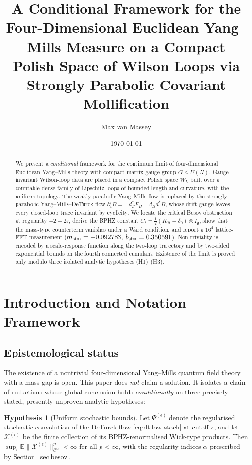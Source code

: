\documentclass[11pt,a4paper]{article}
\title{A Conditional Framework for the Four-Dimensional Euclidean Yang--Mills Measure on a Compact Polish Space of Wilson Loops via Strongly Parabolic Covariant Mollification}
\author{Max van Massey}
\date{\today}
\theoremstyle{definition}
\newtheorem{hypothesis}{Hypothesis}
\theoremstyle{remark}
\newcommand{\E}{\mathbb{E}}
\newcommand{\g}{\mathfrak{g}}
\begin{document}
\maketitle

\begin{abstract}
We present a \emph{conditional} framework for the continuum limit of four-dimensional Euclidean Yang--Mills theory with compact matrix gauge group $G\le U(N)$. Gauge-invariant Wilson-loop data are placed in a compact Polish space $W_L$ built over a countable dense family of Lipschitz loops of bounded length and curvature, with the uniform topology. The weakly parabolic Yang--Mills flow is replaced by the strongly parabolic Yang--Mills--DeTurck flow $\partial_t B=-d_B^*F_B-d_Bd^*B$, whose drift gauge leaves every closed-loop trace invariant by cyclicity. We locate the critical Besov obstruction at regularity $-2-2\varepsilon$, derive the BPHZ constant $C_t=\tfrac12(K_{2t}-\delta_0)\otimes I_{\g}$, show that the mass-type counterterm vanishes under a Ward condition, and report a $16^4$ lattice-FFT measurement ($m_{\rm sim}=-0.092783$, $b_{\rm sim}=0.350591$). Non-triviality is encoded by a scale-response function along the two-loop trajectory and by two-sided exponential bounds on the fourth connected cumulant. Existence of the limit is proved only modulo three isolated analytic hypotheses \textup{(H1)--(H3)}.
\end{abstract}

\tableofcontents

\section{Introduction and Notation Framework}\label{sec:intro}

\subsection{Epistemological status}

The existence of a nontrivial four-dimensional Yang--Mills quantum field theory with a mass gap is open. This paper does \emph{not} claim a solution. It isolates a chain of reductions whose global conclusion holds \emph{conditionally} on three precisely stated, presently unproven analytic hypotheses:

\begin{hypothesis}[Uniform stochastic bounds]\label{h:H1}
Let $\Psi^{(\epsilon)}$ denote the regularised stochastic convolution of the DeTurck flow \eqref{eq:dtflow-stoch} at cutoff $\epsilon$, and let $\mathcal X^{(\epsilon)}$ be the finite collection of its BPHZ-renormalised Wick-type products. Then $\sup_{\epsilon}\E\|\mathcal X^{(\epsilon)}\|_{\mathcal C^{\alpha}}^{p}<\infty$ for all $p<\infty$, with the regularity indices $\alpha$ prescribed by Section~\ref{sec:besov}.
\end{hypothesis}
\end{document}
